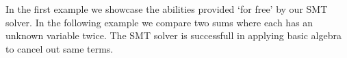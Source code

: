 In the first example we showcase the abilities provided `for free' by
our SMT solver. In the following example we compare two sums where each
has an unknown variable twice.
The SMT solver is successfull in applying basic algebra to cancel out
same terms.
